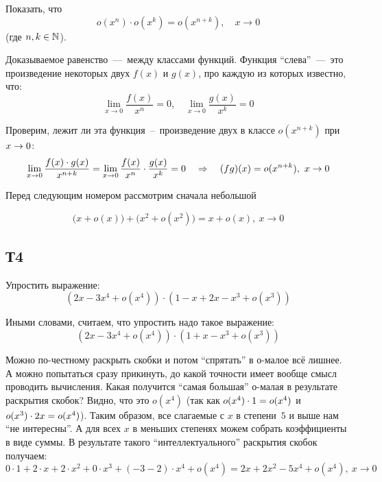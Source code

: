 \documentclass[a4paper,12pt]{article}
\begin{document}
  Показать, что
  \[
    o(x^n) \cdot o(x^k) = o(x^{n + k}),\quad x \to 0
  \]
  (где $n, k \in \mathbb N$).
  
  \begin{solution}
    Доказываемое равенство~---~между классами функций.
    Функция ``слева''~---~это произведение некоторых двух $f(x)$ и $g(x)$, про каждую из которых известно, что:
    \[
      \lim_{x \to 0} \frac{f(x)}{x^n} = 0,\quad \lim_{x \to 0} \frac{g(x)}{x^k} = 0
    \]
    
    Проверим, лежит ли эта функция~--~произведение двух в классе $o(x^{n + k})$ при $x \hm\to 0$:
    \[
      \lim_{x \to 0} \frac{f(x) \cdot g(x)}{x^{n + k}} = \lim_{x \to 0} \frac{f(x)}{x^n} \cdot \frac{g(x)}{x^k} = 0
        \quad\Rightarrow\quad (fg)(x) = o(x^{n + k}),\ x \hm\to 0
    \]
  \end{solution}

  
  
  Перед следующим номером рассмотрим сначала небольшой
  
  \begin{example}
    \[
      \bigl(x + o(x)\bigr) + \bigl(x^2 + o(x^2)\bigr) = x + o(x),\ x \to 0
    \]
  \end{example}
  
  
  
  \subsection{Т4}
  
  Упростить выражение:
  \[
    (2x - 3x^4 + o(x^4)) \cdot (1 - x + 2x - x^3 + o(x^3))
  \]
  
  \begin{solution}
    Иными словами, считаем, что упростить надо такое выражение:
    \[
      (2x - 3x^4 + o(x^4)) \cdot (1 + x - x^3 + o(x^3))
    \]
    
    Можно по-честному раскрыть скобки и потом ``спрятать'' в о-малое всё лишнее.
    А можно попытаться сразу прикинуть, до какой точности имеет вообще смысл проводить вычисления.
    Какая получится ``самая большая'' о-малая в результате раскрытия скобок?
    Видно, что это $o(x^4)$ (так как $o(x^4) \hm\cdot 1 \hm= o(x^4)$ и $o(x^3) \hm\cdot 2x \hm= o(x^4)$).
    Таким образом, все слагаемые с $x$ в степени~$5$ и выше нам ``не интересны''.
    А для всех $x$ в меньших степенях можем собрать коэффициенты в виде суммы.
    В результате такого ``интеллектуального'' раскрытия скобок получаем:
    \[
      0 \cdot 1 + 2 \cdot x + 2 \cdot x^2 + 0 \cdot x^3 + (-3 - 2) \cdot x^4 + o(x^4)
        = 2x + 2x^2 - 5x^4 + o(x^4),\ x \to 0
    \]
  \end{solution}
  
\end{document}
